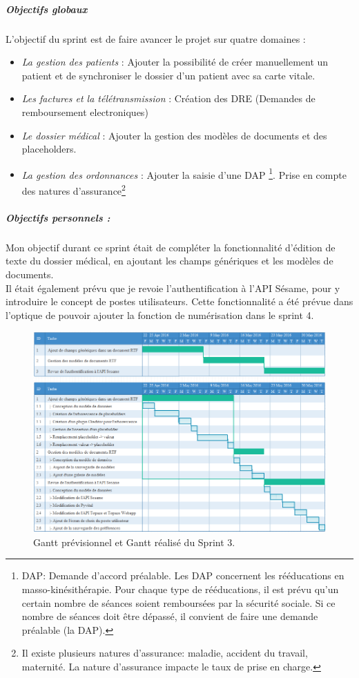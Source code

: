 \subparagraph{Objectifs globaux}
L'objectif du sprint est de faire avancer le projet sur quatre domaines : 
\begin{itemize}
\item \textit{La gestion des patients} : Ajouter la possibilité de créer manuellement un patient et de synchroniser le dossier d'un patient avec sa carte vitale.

\item \textit{Les factures et la télétransmission} :
Création des DRE (Demandes de remboursement electroniques)

\item \textit{Le dossier médical} : Ajouter la gestion des modèles de documents et des placeholders.

\item \textit{La gestion des ordonnances} : Ajouter la saisie d'une DAP \footnote{DAP: Demande d'accord préalable. Les DAP concernent les rééducations en masso-kinésithérapie. Pour chaque type de rééducations, il est prévu qu'un certain nombre de séances soient remboursées par la sécurité sociale. Si ce nombre de séances doit être dépassé, il convient de faire une demande préalable (la DAP).}. Prise en compte des natures d'assurance\footnote{Il existe plusieurs natures d'assurance: maladie, accident du travail, maternité. La nature d'assurance impacte le taux de prise en charge.}
\end{itemize} 

\subparagraph{Objectifs personnels :}
Mon objectif durant ce sprint était de compléter la fonctionnalité d'édition de texte du dossier médical, en ajoutant les champs génériques et les modèles de documents.\\
Il était également prévu que je revoie l'authentification à l'API Sésame, pour y introduire le concept de postes utilisateurs. Cette fonctionnalité a été prévue dans l'optique de pouvoir ajouter la fonction de numérisation dans le sprint 4.

\begin{figure}[H]
  \centering
  \centerline{\includegraphics[width=20.5cm]{./img/gantt_sprint3}}
  \caption{\label{fig:mb_va_ast} Gantt prévisionnel et Gantt réalisé du Sprint 3.}
\end{figure}

